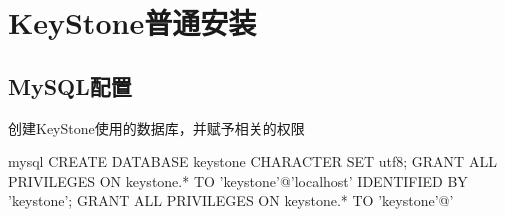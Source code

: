 \chapter{KeyStone普通安装}
\label{keystone_install}

\section{MySQL配置}

创建KeyStone使用的数据库，并赋予相关的权限
\begin{code-block}{mysql}
CREATE DATABASE keystone CHARACTER SET utf8;
GRANT ALL PRIVILEGES ON keystone.* TO 'keystone'@'localhost' IDENTIFIED BY 'keystone';
GRANT ALL PRIVILEGES ON keystone.* TO 'keystone'@'%
\end{code-block}

